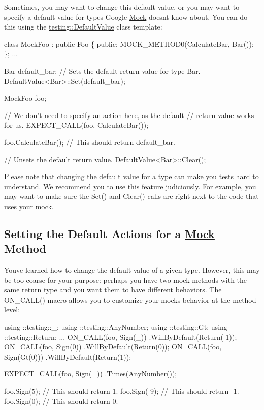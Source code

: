 Sometimes, you may want to change this default value, or you may want to specify a default value for types Google \hyperlink{classMock}{Mock} doesn\textquotesingle{}t know about. You can do this using the {\ttfamily \hyperlink{classtesting_1_1DefaultValue}{testing\+::\+Default\+Value}} class template\+:


\begin{DoxyCode}
\textcolor{keyword}{class }MockFoo : \textcolor{keyword}{public} Foo \{
 \textcolor{keyword}{public}:
  MOCK\_METHOD0(CalculateBar, Bar());
\};
...

  Bar default\_bar;
  \textcolor{comment}{// Sets the default return value for type Bar.}
  DefaultValue<Bar>::Set(default\_bar);

  MockFoo foo;

  \textcolor{comment}{// We don't need to specify an action here, as the default}
  \textcolor{comment}{// return value works for us.}
  EXPECT\_CALL(foo, CalculateBar());

  foo.CalculateBar();  \textcolor{comment}{// This should return default\_bar.}

  \textcolor{comment}{// Unsets the default return value.}
  DefaultValue<Bar>::Clear();
\end{DoxyCode}


Please note that changing the default value for a type can make you tests hard to understand. We recommend you to use this feature judiciously. For example, you may want to make sure the {\ttfamily Set()} and {\ttfamily Clear()} calls are right next to the code that uses your mock.

\subsection*{Setting the Default Actions for a \hyperlink{classMock}{Mock} Method}

You\textquotesingle{}ve learned how to change the default value of a given type. However, this may be too coarse for your purpose\+: perhaps you have two mock methods with the same return type and you want them to have different behaviors. The {\ttfamily O\+N\+\_\+\+C\+A\+L\+L()} macro allows you to customize your mock\textquotesingle{}s behavior at the method level\+:


\begin{DoxyCode}
using ::testing::\_;
using ::testing::AnyNumber;
using ::testing::Gt;
using ::testing::Return;
...
  ON\_CALL(foo, Sign(\_))
      .WillByDefault(Return(-1));
  ON\_CALL(foo, Sign(0))
      .WillByDefault(Return(0));
  ON\_CALL(foo, Sign(Gt(0)))
      .WillByDefault(Return(1));

  EXPECT\_CALL(foo, Sign(\_))
      .Times(AnyNumber());

  foo.Sign(5);   \textcolor{comment}{// This should return 1.}
  foo.Sign(-9);  \textcolor{comment}{// This should return -1.}
  foo.Sign(0);   \textcolor{comment}{// This should return 0.}
\end{DoxyCode}


